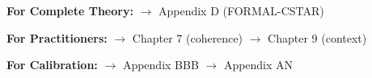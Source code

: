 \begin{tcolorbox}[
    colback=gray!10!white,
    colframe=gray!75!black,
    title={\textbf{Reading Paths}}
]
\textbf{For Complete Theory:} $\rightarrow$ Appendix D (FORMAL-CSTAR)

\textbf{For Practitioners:} $\rightarrow$ Chapter 7 (coherence) $\rightarrow$ Chapter 9 (context)

\textbf{For Calibration:} $\rightarrow$ Appendix BBB $\rightarrow$ Appendix AN
\end{tcolorbox}

